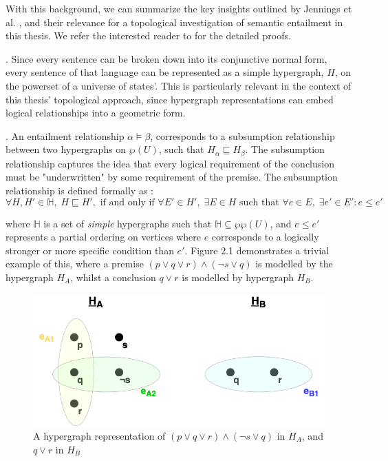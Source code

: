 \documentclass[12pt,twoside]{report}
\begin{document}
With this background, we can summarize the key insights outlined by Jennings et al. \cite{leibnizianAnalysis}, and their relevance for a topological investigation of semantic entailment in this thesis. We refer the interested reader to \cite{leibnizianAnalysis} for the detailed proofs. \newline \par {}. Since every sentence can be broken down into its conjunctive normal form, every sentence of that language can be represented as a simple hypergraph, $H$, on the powerset of a universe of states'. This is particularly relevant in the context of this thesis' topological approach, since hypergraph representations can embed logical relationships into a geometric form. \newline \par {}. An entailment relationship $\alpha \models \beta$, corresponds to a subsumption relationship between two hypergraphs on $\wp(U)$, such that $H_{\alpha} \sqsubseteq H_{\beta}$. The subsumption relationship captures the idea that every logical requirement of the conclusion must be "underwritten" by some requirement of the premise. The subsumption relationship is defined formally as \cite{leibnizianAnalysis}: 
$$
\forall H, H' \in \mathbb{H},\; H \sqsubseteq H',
\text{ if and only if }
\forall E' \in H',\; \exists E \in H \text{ such that } 
\forall e \in E,\; \exists e' \in E' : e \leq e'  
$$ 

where $\mathbb{H}$ is a set of \textit{simple} hypergraphs such that $\mathbb{H} \subseteq \wp\wp(U)$, and $e \leq e'$ represents a partial ordering on vertices where $e$ corresponds to a logically stronger or more specific condition than $e'$. Figure 2.1 demonstrates a trivial example of this, where a premise $(p \lor q \lor r) \land (\neg s \lor q) $  is modelled by the hypergraph $H_A$, whilst a conclusion $q \lor r$ is modelled by hypergraph $H_B$.

\begin{figure}[H]
\centering
\includegraphics[width = 0.5\hsize]{./figures/HypergraphIntro.drawio.png}
\caption{A hypergraph representation of $(p \lor q \lor r) \land (\neg s \lor q)$ in $H_A$, and $q \lor r$ in $H_B$}
\label{fig:Hypergraphs}
\end{figure}
\end{document}
